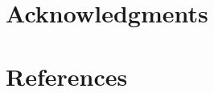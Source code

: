 \documentclass[final,11pt,times]{elsarticle}
\begin{document}

\section*{Acknowledgments}



\section*{References}
\end{document}
